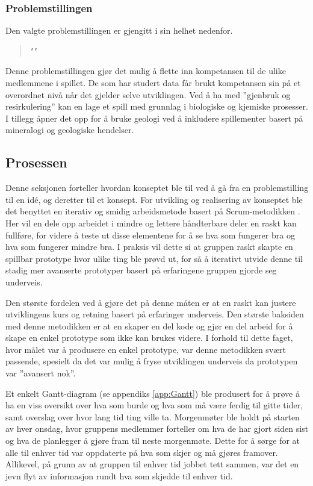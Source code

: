 \subsubsection{Problemstillingen}
Den valgte problemstillingen er gjengitt i sin helhet nedenfor.
\begin{quotation}
\large\emph{""}
\end{quotation}
Denne problemstillingen gjør det mulig å flette inn kompetansen til de
ulike medlemmene i spillet. De som har studert data får brukt
kompetansen sin på et overordnet nivå når det gjelder selve utviklingen.
Ved å ha med ''gjenbruk og resirkulering'' kan en lage et spill med
grunnlag i biologiske og kjemiske prosesser. I tillegg åpner det opp for å bruke geologi ved å inkludere spillementer basert på mineralogi og geologiske hendelser. 

\subsection{Prosessen}
Denne seksjonen forteller hvordan konseptet ble til ved å gå fra en problemstilling til en idé, og deretter til et konsept. For utvikling og realisering av konseptet ble det benyttet en iterativ og smidig arbeidsmetode \cite{online:agile_manifesto} basert på Scrum-metodikken \cite{Scrum}. Her vil en dele opp arbeidet i mindre og lettere håndterbare deler en raskt kan fullføre, for videre å teste ut disse elementene for å se hva som fungerer bra og hva som fungerer mindre bra. I praksis vil dette si at gruppen raskt skapte en spillbar prototype hvor ulike ting ble prøvd ut, for så å iterativt utvide denne til stadig mer avanserte prototyper basert på erfaringene gruppen gjorde seg underveis.

Den største fordelen ved å gjøre det på denne måten er at en raskt kan justere utviklingens kurs og retning basert på erfaringer underveis. 
Den største baksiden med denne metodikken er at en skaper en del kode og gjør en del arbeid for å skape en enkel prototype som ikke kan brukes videre.
I forhold til dette faget, hvor målet var å produsere en enkel prototype, var denne metodikken svært passende, spesielt da det var mulig å fryse utviklingen underveis da prototypen var ''avansert nok''.


Et enkelt Gantt-diagram (se appendiks \ref{app:Gantt}) ble produsert for å prøve å ha en viss oversikt over hva som burde og hva som må være ferdig til gitte tider, samt overslag over hvor lang tid ting ville ta.
Morgenmøter ble holdt på starten av hver onsdag, hvor gruppens medlemmer forteller om hva de har gjort siden sist og hva de planlegger å gjøre fram til neste morgenmøte. Dette for å sørge for at alle til enhver tid var oppdaterte på hva som skjer og må gjøres framover.
Allikevel, på grunn av at gruppen til enhver tid jobbet tett sammen, var det en jevn flyt av informasjon rundt hva som skjedde til enhver tid.


